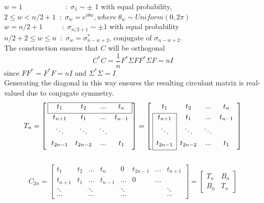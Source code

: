 	$w=1\qquad \qquad \qquad : \; \sigma_{1} \sim \pm$ 1 with equal probability,
	\\[1em]
	$2 \le w < n/2+1 \; \; : \; \sigma_{w}=e^{i\theta w}, where \; {\theta}_{w} \sim Uniform(0,2\pi) $
	\\[1em]
	$w=n/2+1 \qquad \; \; \, : \; \sigma_{n/2+1} \sim \pm 1 $ with equal probability 
	\\[1em]
	
	$n/2+2 \le w \le n \; \; : \; \sigma_{w}=\sigma^{*}_{n-w+2}$, conjugate of  $\sigma_{n-w+2}$.
	\\
	The construction ensures that $C$ will be orthogonal
	$$ C^*C=\dfrac{{1}}{n} F^* \Sigma F F^* \Sigma F = nI $$
	since $FF^*=F^*F=nI$ and $\Sigma^* \Sigma = I$
	$$
	$$
	Generating the diagonal in this way ensures the resulting circulant matrix is real-valued due to conjugate symmetry.
	$$
	T_{n} = \left[ \: 
	\begin{array}{*{4}{c}}
	\cline{1-4}
	\multicolumn{1}{|c}{t_{1}} & t_{2} & ...& \multicolumn{1}{c|}{t_{n}}           \\[0.3em]
	\cline{1-4}
	t_{n+1} & t_{1} & ... & t_{n-1} \\[0.3em]
	\ddots &\ddots & \ddots &    \\[0.3em]
	t_{2n-1} & t_{2n-2} & ... & t_{1}      \\[0.3em]    
	\end{array}
	\right]
	=
	\left[ \:
	\begin{array}{*{4}{c}}
	t_{1} & t_{2} & ...& t_{n}        \\[0.3em]
	\cline{1-1}
	\multicolumn{1}{|c|}{t_{n+1}} & t_{1} & ... & t_{n-1} \\[0.3em]
	\multicolumn{1}{|c|}{\ddots} & \ddots & \ddots &    \\[0.3em]
	\multicolumn{1}{|c|}{t_{2n-1}} & t_{2n-2} & ... & t_{1}          \\[0.3em]
	\cline{1-1}
	\end{array}
	\right]
	$$
	\\
	$$
	C_{2n} =\begin{bmatrix}
	t_{1}   & t_{2} & ...    & t_{n}  & 0   & t_{2n-1} & ... &  t_{n+1}   \\[0.3em]
	t_{n+1} & t_{1} & ...    & t_{n-1}& ... & 0  & ... &          \\[0.3em]
	\ddots  &       & \ddots &        & \ddots & & &\ddots    \\[0.3em]
	\cdots  &       & \cdots &       & \cdots & & & \cdots
	\end{bmatrix}
	=
	\begin{bmatrix}
	T_{n} & B_{n}            \\[0.3em]
	B_{n} & T_{n}   
	\end{bmatrix}
	$$
	
